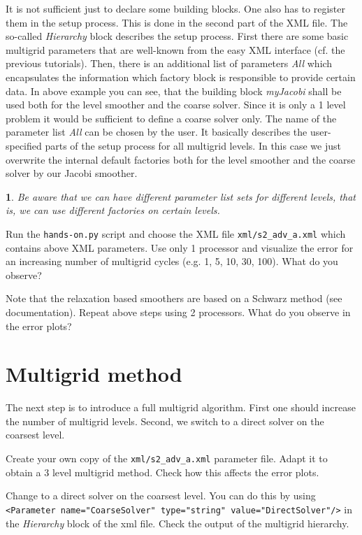 \documentclass[10pt,fleqn]{book}
\newtheorem*{mycomment}{\ding{42}}
\begin{document}
It is not sufficient just to declare some building blocks. One also has to register them in the setup process. This is done in the second part of the XML file. The so-called \textit{Hierarchy} block describes the setup process. First there are some basic multigrid parameters that are well-known from the easy XML interface (cf. the previous tutorials). Then, there is an additional list of parameters \textit{All} which encapsulates the information which factory block is responsible to provide certain data. In above example you can see, that the building block \textit{myJacobi} shall be used both for the level smoother and the coarse solver. Since it is only a 1 level problem it would be sufficient to define a coarse solver only.
The name of the parameter list \textit{All} can be chosen by the user. It basically describes the user-specified parts of the setup process for all multigrid levels. In this case we just overwrite the internal default factories both for the level smoother and the coarse solver by our Jacobi smoother.
\begin{mycomment}
Be aware that we can have different parameter list sets for different levels, that is, we can use different factories on certain levels.
\end{mycomment}

\begin{exercise}
Run the \verb|hands-on.py| script and choose the XML file \texttt{xml/s2\_adv\_a.xml} which contains above XML parameters. Use only 1 processor and visualize the error for an increasing number of multigrid cycles (e.g. 1, 5, 10, 30, 100). What do you observe?
\end{exercise}
\begin{exercise}
Note that the relaxation based smoothers are based on a Schwarz method (see \ifpack documentation). Repeat above steps using 2 processors. What do you observe in the error plots?
\end{exercise}

\section{Multigrid method}
The next step is to introduce a full multigrid algorithm. First one should increase the number of multigrid levels. Second, we switch to a direct solver on the coarsest level.\\

\begin{exercise}
Create your own copy of the \texttt{xml/s2\_adv\_a.xml} parameter file. Adapt it to obtain a 3 level multigrid method. Check how this affects the error plots.
\end{exercise}
\begin{exercise}
Change to a direct solver on the coarsest level. You can do this by using \texttt{<Parameter name="CoarseSolver" type="string" value="DirectSolver"/>} in the \textit{Hierarchy} block of the xml file. Check the output of the multigrid hierarchy.
\end{exercise}
\end{document}
